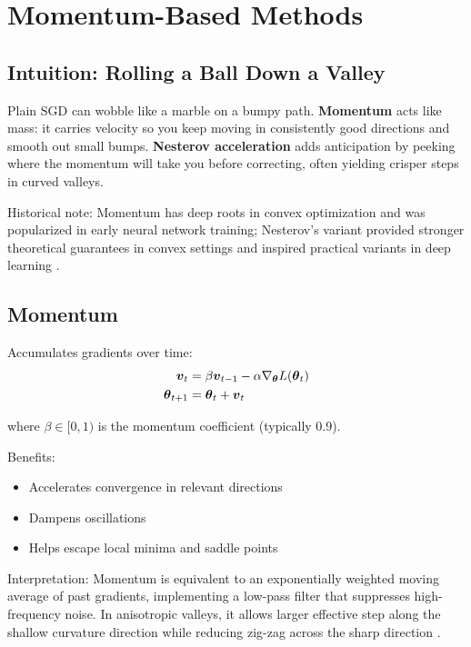 
\section{Momentum-Based Methods }
\label{sec:momentum}

\subsection{Intuition: Rolling a Ball Down a Valley}

Plain SGD can wobble like a marble on a bumpy path. \textbf{Momentum} acts like mass: it carries velocity so you keep moving in consistently good directions and smooth out small bumps. \textbf{Nesterov acceleration} adds anticipation by peeking where the momentum will take you before correcting, often yielding crisper steps in curved valleys.

Historical note: Momentum has deep roots in convex optimization and was popularized in early neural network training; Nesterov's variant provided stronger theoretical guarantees in convex settings and inspired practical variants in deep learning \cite{Polyak1964,Nesterov1983,GoodfellowEtAl2016,Bishop2006}.

\subsection{Momentum}

Accumulates gradients over time:
\begin{align}
\boldsymbol{v}_t &= \beta \boldsymbol{v}_{t-1} - \alpha \nabla_{\boldsymbol{\theta}} L(\boldsymbol{\theta}_t) \\
\boldsymbol{\theta}_{t+1} &= \boldsymbol{\theta}_t + \boldsymbol{v}_t
\end{align}

where $\beta \in [0, 1)$ is the momentum coefficient (typically 0.9).

Benefits:
\begin{itemize}
    \item Accelerates convergence in relevant directions
    \item Dampens oscillations
    \item Helps escape local minima and saddle points
\end{itemize}

Interpretation: Momentum is equivalent to an exponentially weighted moving average of past gradients, implementing a low-pass filter that suppresses high-frequency noise. In anisotropic valleys, it allows larger effective step along the shallow curvature direction while reducing zig-zag across the sharp direction \cite{Polyak1964,WebOptimizationDLBook,D2LChapterOptimization}.

